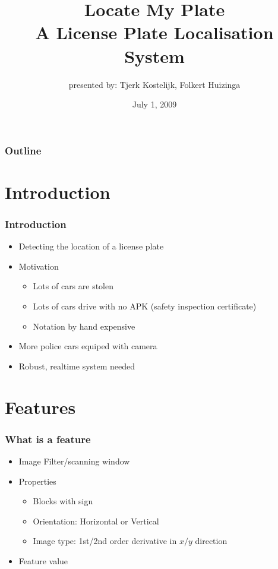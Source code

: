 \documentclass{beamer}
\title{Locate My Plate \\ A License Plate Localisation System}
\subtitle{presented by: Tjerk Kostelijk, Folkert Huizinga}
\date{July 1, 2009}
\begin{document}
\frame{\titlepage}

\setcounter{tocdepth}{1}

\frame
{
  \frametitle{Outline}
  \small
  \tableofcontents
  \normalsize
}

\setcounter{tocdepth}{2}



\section{Introduction}
\frame
{
  \frametitle{Introduction}
	
  \begin{itemize}
		\item <+-| alert@+> Detecting the location of a license plate 
		\item <+-| alert@+> Motivation
		\begin{itemize}
			\item <+-| alert@+> Lots of cars are stolen
			\item <+-| alert@+> Lots of cars drive with no APK (safety inspection certificate)
			\item <+-| alert@+> Notation by hand expensive
		\end{itemize}
		\item <+-| alert@+> More police cars equiped with camera 
		\item <+-| alert@+> Robust, realtime system needed
  \end{itemize}
}

\section{Features}
\frame
{
  \frametitle{What is a feature}
	
  \begin{itemize}
  \item <+-| alert@+> Image Filter/scanning window
  \item <+-| alert@+> Properties
		\begin{itemize}
			\item <+-| alert@+> Blocks with sign 
			\item <+-| alert@+> Orientation: Horizontal or Vertical
			\item <+-| alert@+> Image type: 1st/2nd order derivative in $x/y$ direction
		\end{itemize}
  \item <+-| alert@+> Feature value
  \end{itemize}
}
\end{document}
